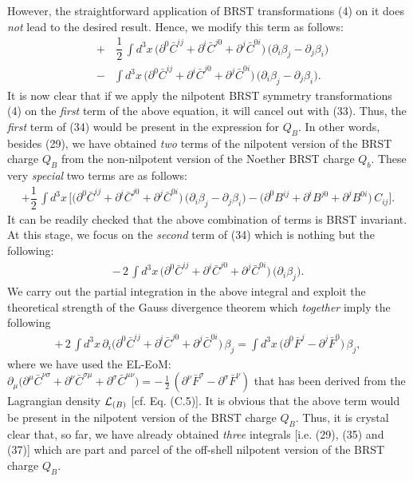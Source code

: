 \documentclass[12pt]{article}
\begin{document}
However, the straightforward application of 
BRST transformations (4) on it does {\it not} lead to the desired result. Hence, we modify this term as follows:
\begin{eqnarray}\label{34} 
& + &\, \dfrac{1}{2}\, \int d^3 x\, \big (\partial^0 \bar C^{ij} + \partial^i \bar C^{j0} + \partial^j \bar C^{0i} \big )\,
\big (\partial_i \beta_j - \partial_j \beta_i \big )
\nonumber\\
& - &  \int d^3 x\, \big (\partial^0 \bar C^{ij} + \partial^i \bar C^{j0} + \partial^j \bar C^{0i} \big )\,
\big (\partial_i \beta_j - \partial_j \beta_i \big ).
\end{eqnarray}
It is now clear that if we apply the 
nilpotent BRST symmetry transformations (4) on the {\it first} term of the above equation, it will cancel out with (33). Thus, the
{\it first} term of (34) would be present in the expression for $Q_B$.  In other words, besides (29), 
we have obtained {\it two} terms of the nilpotent version of the
BRST charge $Q_B$ from the non-nilpotent version of the Noether BRST charge $Q_b$. These 
very {\it special} two terms are as follows:
\begin{eqnarray}\label{35} 
+  \dfrac{1}{2}\, \int d^3 x\, \Big [\big (\partial^0 \bar C^{ij} + \partial^i \bar C^{j0} + \partial^j \bar C^{0i} \big )\,
\big (\partial_i \beta_j - \partial_j \beta_i \big ) - \big (\partial^0 B^{ij} + \partial^i B^{j0}  + \partial^j B^{0i} \big ) \, C_{ij} \Big ].
\end{eqnarray}
It can be readily checked that the above combination of terms is BRST invariant. At this stage, we focus 
on the {\it second} term of (34)  which is nothing but the following:
\begin{eqnarray}\label{36} 
-\,2\,   \int d^3 x\, \big (\partial^0 \bar C^{ij} + \partial^i \bar C^{j0} + \partial^j \bar C^{0i} \big )\,
\big (\partial_i \beta_j \big ).
\end{eqnarray}
We carry out the partial integration 
in the above integral and exploit the theoretical strength of the Gauss divergence theorem which {\it together} imply
the following
\begin{eqnarray}\label{37} 
+\,2\,   \int d^3 x\, \partial_i \big (\partial^0 \bar C^{ij} + \partial^i \bar C^{j0} + \partial^j \bar C^{0i} \big )\,
\beta_j  = \int d^3 x\, \big (\partial^0 \bar F^j - \partial^j \bar F^0 \big )\, \beta_j,
\end{eqnarray}
where we have used the EL-EoM: $\partial_\mu \big (\partial^\mu \bar C^{\nu\sigma} + \partial^\nu \bar C^{\sigma\mu} 
+ \partial^\sigma \bar C^{\mu\nu} \big ) = -\, \frac{1}{2}\, (\partial^\nu \bar F^\sigma -  \partial^\sigma \bar F^\nu)$ that
has been derived from the Lagrangian density ${\cal L}_{(B)} $ [cf. Eq. (C.5)]. It is obvious that the above term would be present in the 
nilpotent version of the BRST charge $Q_B$. Thus, it is crystal clear that, so far, we have already obtained {\it three} integrals [i.e. (29), (35) and (37)]
which are part and parcel of the off-shell nilpotent version of the BRST charge $Q_B$.
\end{document}
